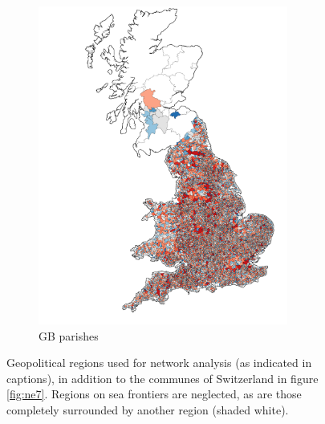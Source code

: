 \begin{figure}[tbp]
\begin{subfigure}[b]{0.48\textwidth}
         \includegraphics[width=0.9\textwidth]{./appendices/figures/gbp_lowres.pdf}
         \caption{GB parishes}
         \label{appfig:mapd}
     \end{subfigure}

	\caption{Geopolitical regions used for network analysis (as indicated in captions), in addition to the communes of Switzerland in figure \ref{fig:ne7}. Regions on sea frontiers are neglected, as are those completely surrounded by another region (shaded white).}
	\label{appfig:maps}
\end{figure}